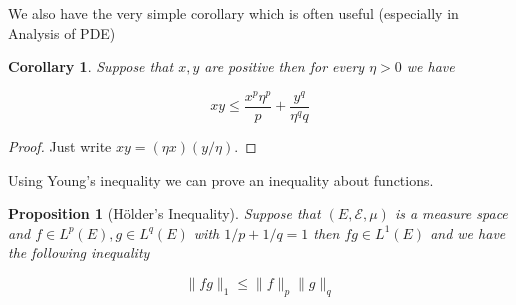 \documentclass[
]{book}
\newtheorem{corollary}{Corollary}[chapter]
\newtheorem{proposition}{Proposition}[chapter]
\theoremstyle{definition}
\theoremstyle{definition}
\theoremstyle{definition}
\theoremstyle{definition}
\theoremstyle{remark}
\begin{document}
We also have the very simple corollary which is often useful (especially in Analysis of PDE)

\begin{corollary}
Suppose that \(x,y\) are positive then for every \(\eta >0\) we have

\[ xy \leq \frac{x^p \eta^p}{p} + \frac{y^q}{\eta^q q} \]
\end{corollary}

\begin{proof}
Just write \(xy = (\eta x)(y/\eta)\).
\end{proof}

Using Young's inequality we can prove an inequality about functions.

\begin{proposition}[Hölder's Inequality]
Suppose that \((E, \mathcal{E}, \mu)\) is a measure space and \(f \in L^p(E), g \in L^q(E)\) with \(1/p+1/q =1\) then \(fg \in L^1(E)\) and we have the following inequality

\[ \|fg\|_1 \leq  \|f\|_p \|g\|_q \]
\end{proposition}
\end{document}
